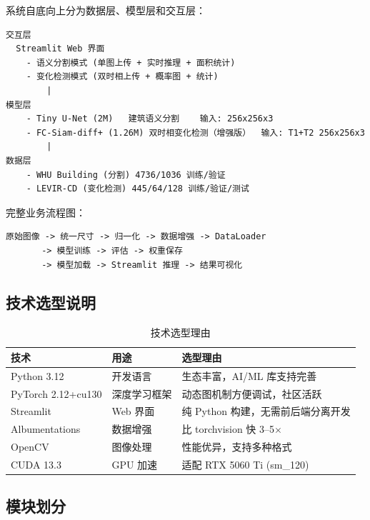 \documentclass[12pt,a4paper]{article}
\begin{document}
系统自底向上分为数据层、模型层和交互层：

\begin{lstlisting}[frame=none,numbers=none,language={}]
交互层
  Streamlit Web 界面
    - 语义分割模式 (单图上传 + 实时推理 + 面积统计)
    - 变化检测模式 (双时相上传 + 概率图 + 统计)
        |
模型层
    - Tiny U-Net (2M)   建筑语义分割    输入: 256x256x3
    - FC-Siam-diff+ (1.26M) 双时相变化检测（增强版）  输入: T1+T2 256x256x3
        |
数据层
    - WHU Building (分割) 4736/1036 训练/验证
    - LEVIR-CD (变化检测) 445/64/128 训练/验证/测试
\end{lstlisting}

完整业务流程图：

\begin{lstlisting}[frame=none,numbers=none,language={}]
原始图像 -> 统一尺寸 -> 归一化 -> 数据增强 -> DataLoader
       -> 模型训练 -> 评估 -> 权重保存
       -> 模型加载 -> Streamlit 推理 -> 结果可视化
\end{lstlisting}

\subsection{技术选型说明}

\begin{table}[H]
\centering
\caption{技术选型理由}
\label{tab:tech}
\begin{tabular}{lll}
\toprule
技术 & 用途 & 选型理由 \\
\midrule
Python 3.12 & 开发语言 & 生态丰富，AI/ML 库支持完善 \\
PyTorch 2.12+cu130 & 深度学习框架 & 动态图机制方便调试，社区活跃 \\
Streamlit & Web 界面 & 纯 Python 构建，无需前后端分离开发 \\
Albumentations & 数据增强 & 比 torchvision 快 3--5$\times$ \\
OpenCV & 图像处理 & 性能优异，支持多种格式 \\
CUDA 13.3 & GPU 加速 & 适配 RTX 5060 Ti (sm\_120) \\
\bottomrule
\end{tabular}
\end{table}

\subsection{模块划分}
\end{document}
